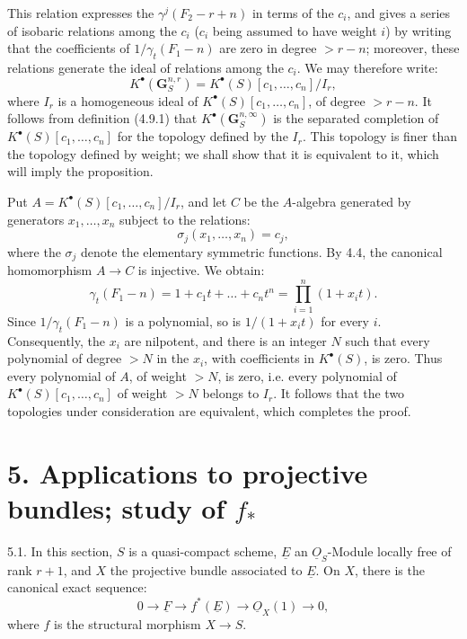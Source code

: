 This relation expresses the \(\gamma^j(F_2-r+n)\) in terms of the \(c_i\), and gives a series of isobaric relations among the \(c_i\) (\(c_i\) being assumed to have weight \(i\)) by writing that the coefficients of \(1/\gamma_t(F_1-n)\) are zero in degree \(>r-n\); moreover, these relations generate the ideal of relations among the \(c_i\). We may therefore write:
%
\[
  K^{\bullet}(\mathbf G_S^{n,r})=K^{\bullet}(S)[c_1,\ldots,c_n]/I_r,
\]
where \(I_r\) is a homogeneous ideal of \(K^{\bullet}(S)[c_1,\ldots,c_n]\), of degree \(>r-n\). It follows from definition (4.9.1) that \(K^{\bullet}(\mathbf G_S^{n,\infty})\) is the separated completion of \(K^{\bullet}(S)[c_1,\ldots,c_n]\) for the topology defined by the \(I_r\). This topology is finer than the topology defined by weight; we shall show that it is equivalent to it, which will imply the proposition.

Put \(A=K^{\bullet}(S)[c_1,\ldots,c_n]/I_r\), and let \(C\) be the \(A\)-algebra generated by generators \(x_1,\ldots,x_n\) subject to the relations:
\[
  \sigma_j(x_1,\ldots,x_n)=c_j,
\]
where the \(\sigma_j\) denote the elementary symmetric functions. By 4.4, the canonical homomorphism \(A\to C\) is injective. We obtain:
\[
  \gamma_t(F_1-n)
  =1+c_1t+\ldots+c_nt^n
  =\prod_{i=1}^n(1+x_it).
\]
Since \(1/\gamma_t(F_1-n)\) is a polynomial, so is \(1/(1+x_it)\) for every \(i\). Consequently, the \(x_i\) are nilpotent, and there is an integer \(N\) such that every polynomial of degree \(>N\) in the \(x_i\), with coefficients in \(K^{\bullet}(S)\), is zero. Thus every polynomial of \(A\), of weight \(>N\), is zero, i.e. every polynomial of \(K^{\bullet}(S)[c_1,\ldots,c_n]\) of weight \(>N\) belongs to \(I_r\). It follows that the two topologies under consideration are equivalent, which completes the proof.

\section*{5. Applications to projective bundles; study of \texorpdfstring{$f_*$}{f*}}

5.1.
In this section, $S$ is a quasi-compact scheme, $\underline{E}$ an $\underline{O}_S$-Module locally free of rank $r+1$, and $X$ the projective bundle associated to $\underline{E}$. On $X$, there is the canonical exact sequence:
\[
  0\longrightarrow \underline{F}\longrightarrow f^*(\underline{E})\longrightarrow \underline{O}_X(1)\longrightarrow 0,
\]
%
where $f$ is the structural morphism $X\longrightarrow S$.

